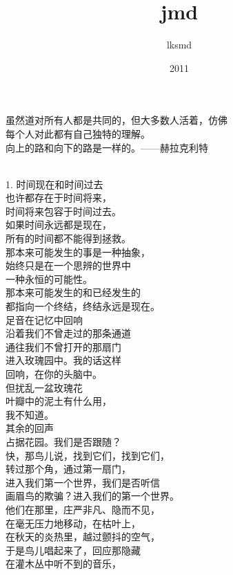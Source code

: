 \documentclass{article}
\title{jmd}
\author{lksmd}
\date{2011}
\begin{document}

\maketitle

\setlength\parindent{0pt}


\Large

﻿虽然道对所有人都是共同的，但大多数人活着，仿佛\\
每个人对此都有自己独特的理解。\\
向上的路和向下的路是一样的。——赫拉克利特 

 
\\
1. 时间现在和时间过去\\
也许都存在于时间将来，\\
时间将来包容于时间过去。\\
如果时间永远都是现在，\\
所有的时间都不能得到拯救。\\
那本来可能发生的事是一种抽象，\\
始终只是在一个思辨的世界中\\
一种永恒的可能性。\\
那本来可能发生的和已经发生的\\
都指向一个终结，终结永远是现在。
\newpage
\\
足音在记忆中回响\\
沿着我们不曾走过的那条通道\\
通往我们不曾打开的那扇门\\
进入玫瑰园中。我的话这样\\
回响，在你的头脑中。\\
但扰乱一盆玫瑰花\\
叶瓣中的泥土有什么用，\\
我不知道。\\
其余的回声\\
占据花园。我们是否跟随？\\
快，那鸟儿说，找到它们，找到它们，\\
转过那个角，通过第一扇门，\\
进入我们第一个世界，我们是否听信\\
画眉鸟的欺骗？进入我们的第一个世界。\\
他们在那里，庄严非凡、隐而不见，\\
在毫无压力地移动，在枯叶上，\\
在秋天的炎热里，越过颤抖的空气，\\
于是鸟儿唱起来了，回应那隐藏\\
在灌木丛中听不到的音乐，\\
\end{document}
